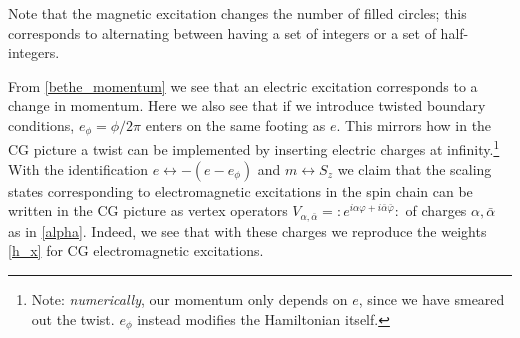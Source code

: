 \documentclass[a4paper,10pt]{article}
\newcommand{\jesper}[1]{$\framebox{\tiny J}$\ \textbf{\texttt{{\color{cyan}\footnotesize#1}}}}
\newcommand{\normord}[1]{\boldsymbol{:}\mathrel{#1}\boldsymbol{:}}
\begin{document}
Note that the magnetic excitation changes the number of filled circles; this corresponds to alternating between having a set of integers or a set of half-integers.
%

From \eqref{bethe_momentum} we see that an electric excitation corresponds to a change in momentum. Here we also %
 see that if we introduce twisted boundary conditions, $e_\phi=\phi/2\pi$ enters on the same footing as $e$. This mirrors how in the CG picture a twist can be implemented by inserting electric charges at infinity.\footnote{Note: \emph{numerically}, our momentum only depends on $e$, since we have smeared out the twist. $e_\phi$ instead modifies the Hamiltonian itself.}  With the identification $e\leftrightarrow -( e-e_\phi)$ and $m \leftrightarrow  S_z$ we claim that the scaling states corresponding to electromagnetic excitations in the spin chain can be written in the CG picture as vertex operators
$V_{\alpha,\bar{\alpha}}=\normord{e^{i\alpha\varphi+ i\bar{\alpha}\bar{\varphi}}}$ of charges $\alpha,\bar{\alpha}$ as in \eqref{alpha}. Indeed, we see that with these charges we reproduce the weights \eqref{h_x} for CG electromagnetic excitations.
\end{document}
